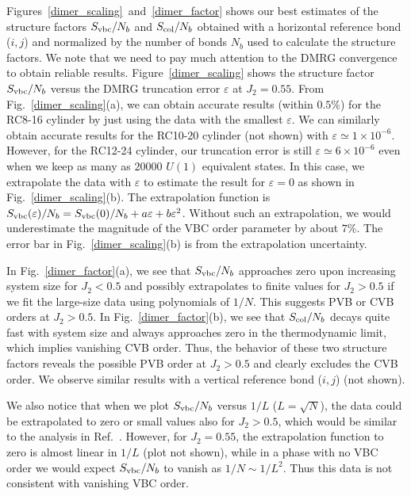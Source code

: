 \documentclass[prl,aps,epsf,showpacs,twocolumn]{revtex4}
\begin{document}
\begin{appendices}
Figures~\ref{dimer_scaling}~and~\ref{dimer_factor} shows our best estimates of the
structure factors $S_{\rm vbc}/N_b$ and $S_{\rm col}/N_b$ obtained with a horizontal reference bond ($i,j$) and normalized by the number of bonds $N_b$ used to calculate the structure factors.
We note that we need to pay much attention to the DMRG convergence to obtain reliable results.  Figure~\ref{dimer_scaling} shows the structure factor $S_{\rm vbc}/N_b$ versus the DMRG truncation error $\varepsilon$ at $J_2 = 0.55$.  From Fig.~\ref{dimer_scaling}(a), we can obtain accurate results (within $0.5\%$) for the RC8-16 cylinder by just using the data with the smallest $\varepsilon$. We can similarly obtain accurate results for the RC10-20 cylinder (not shown) with $\varepsilon \simeq 1\times 10^{-6}$. However, for the RC12-24 cylinder, our truncation error is still $\varepsilon \simeq 6\times 10^{-6}$ even when we keep as many as $20000$ $U(1)$ equivalent states.  In this case, we extrapolate the data with $\varepsilon$ to estimate the result for $\varepsilon = 0$ as shown in Fig.~\ref{dimer_scaling}(b). The extrapolation function is $S_{\rm vbc}(\varepsilon)/N_b=S_{\rm vbc}(0)/N_b+a\varepsilon+b\varepsilon^2$. Without such an extrapolation, we would underestimate the magnitude of the VBC order parameter by about $7\%$.  The error bar in Fig.~\ref{dimer_scaling}(b) is from the extrapolation uncertainty.

In Fig.~\ref{dimer_factor}(a), we see that $S_{\rm vbc}/N_b$ approaches zero upon increasing system size for $J_2 < 0.5$ and possibly extrapolates to finite values for $J_2 > 0.5$ if we fit the
large-size data using polynomials of $1/N$.
This suggests PVB or CVB orders at $J_2  > 0.5$. 
In Fig.~\ref{dimer_factor}(b), we see that $S_{\rm col}/N_b$ decays quite fast with system size and always approaches zero in the thermodynamic limit, which implies vanishing CVB order. Thus, the behavior of these two structure factors reveals the possible PVB order at $J_2 > 0.5$ and clearly excludes the CVB order.  We observe similar results with a vertical reference bond ($i,j$) (not shown).

We also notice that when we plot $S_{\rm vbc}/N_b$ versus $1/L$ ($L = \sqrt{N}$), the data could be extrapolated to zero or small values also for $J_2 > 0.5$, which would be similar to the analysis in Ref.~\cite{PRB_86_024424}.
However, for $J_2 = 0.55$, the extrapolation function to zero is almost linear in $1/L$ (plot not shown), while in a phase with no VBC order we would expect $S_{\rm vbc}/N_b$ to vanish as $1/N \sim 1/L^2$.  Thus this data is not consistent with vanishing VBC order.


\end{appendices}
\end{document}

